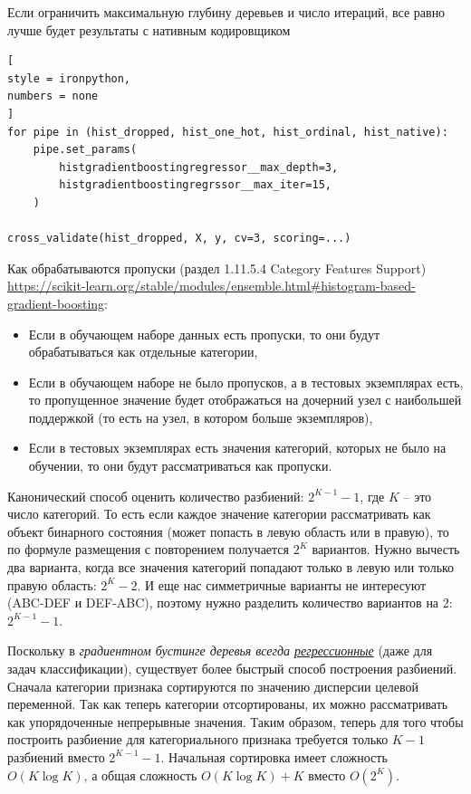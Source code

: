 \documentclass[%
	11pt,
	a4paper,
	utf8,
		]{article}
\begin{document}
Если ограничить максимальную глубину деревьев и число итераций, все равно лучше будет результаты с нативным кодировщиком
\begin{lstlisting}[
style = ironpython,
numbers = none
]
for pipe in (hist_dropped, hist_one_hot, hist_ordinal, hist_native):
    pipe.set_params(
        histgradientboostingregressor__max_depth=3,
        histgradientboostingregrssor__max_iter=15,
    )
    
cross_validate(hist_dropped, X, y, cv=3, scoring=...)
\end{lstlisting}

Как обрабатываются пропуски (раздел 1.11.5.4 Category Features Support) \url{https://scikit-learn.org/stable/modules/ensemble.html#histogram-based-gradient-boosting}:
\begin{itemize}
	\item Если в обучающем наборе данных есть пропуски, то они будут обрабатываться как отдельные категории,
	
	\item Если в обучающем наборе не было пропусков, а в тестовых экземплярах есть, то пропущенное значение будет отображаться на дочерний узел с наибольшей поддержкой (то есть на узел, в котором больше экземпляров),
	
	\item Если в тестовых экземплярах есть значения категорий, которых не было на обучении, то они будут рассматриваться как пропуски.
\end{itemize}

Канонический способ оценить количество разбиений: $ 2^{K - 1} - 1 $, где $ K $ -- это число категорий. То есть если каждое значение категории рассматривать как объект бинарного состояния (может попасть в левую область или в правую), то по формуле размещения с повторением получается $ 2^K $ вариантов. Нужно вычесть два варианта, когда все значения категорий попадают только в левую или только правую область: $ 2^K - 2 $. И еще нас симметричные варианты не интересуют (ABC-DEF и DEF-ABC), поэтому нужно разделить количество вариантов на 2: $ 2^{K - 1} - 1 $.

Поскольку в \emph{градиентном бустинге деревья всегда \underline{регрессионные}} (даже для задач классификации), существует более быстрый способ построения разбиений. Сначала категории признака сортируются по значению дисперсии целевой переменной. Так как теперь категории отсортированы, их можно рассматривать как упорядоченные непрерывные значения. Таким образом, теперь для того чтобы построить разбиение для категориального признака требуется только $ K - 1 $ разбиений вместо $ 2^{K - 1} - 1 $. Начальная сортировка имеет сложность $ O(K \log K) $, а общая сложность $ O(K \log K) + K $ вместо $ O(2^K) $.
\end{document}
